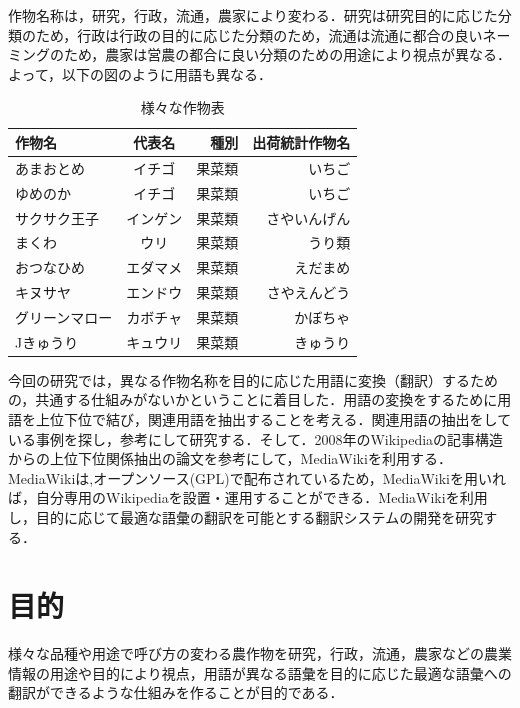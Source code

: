 作物名称は，研究，行政，流通，農家により変わる．研究は研究目的に応じた分類のため，行政は行政の目的に応じた分類のため，流通は流通に都合の良いネーミングのため，農家は営農の都合に良い分類のための用途により視点が異なる．よって，以下の図のように用語も異なる．

\begin{table}[htb]
  \begin{center}
  \begin{tabular}{|l|c|r|r|} \hline
    作物名 & 代表名 & 種別 & 出荷統計作物名 \\ \hline \hline
    あまおとめ & イチゴ & 果菜類 & いちご \\  \hline
    ゆめのか & イチゴ & 果菜類 & いちご \\  \hline
    サクサク王子 & インゲン & 果菜類 & さやいんげん \\  \hline
    まくわ & ウリ & 果菜類 & うり類 \\  \hline
    おつなひめ & エダマメ & 果菜類 & えだまめ \\  \hline
    キヌサヤ & エンドウ & 果菜類 & さやえんどう \\  \hline
    グリーンマロー & カボチャ & 果菜類 & かぼちゃ \\  \hline
   Jきゅうり & キュウリ & 果菜類 & きゅうり \\  \hline
  \end{tabular}
  \end{center}
\caption{様々な作物表}
\end{table}

今回の研究では，異なる作物名称を目的に応じた用語に変換（翻訳）するための，共通する仕組みがないかということに着目した．用語の変換をするために用語を上位下位で結び，関連用語を抽出することを考える．関連用語の抽出をしている事例を探し，参考にして研究する．そして．2008年のWikipediaの記事構造からの上位下位関係抽出の論文を参考にして，MediaWikiを利用する\cite{nogyo2015}．MediaWikiは,オープンソース(GPL)で配布されているため，MediaWikiを用いれば，自分専用のWikipediaを設置・運用することができる\cite{nico2015}．MediaWikiを利用し，目的に応じて最適な語彙の翻訳を可能とする翻訳システムの開発を研究する．


\chapter{目的}
様々な品種や用途で呼び方の変わる農作物を研究，行政，流通，農家などの農業情報の用途や目的により視点，用語が異なる語彙を目的に応じた最適な語彙への翻訳ができるような仕組みを作ることが目的である．

